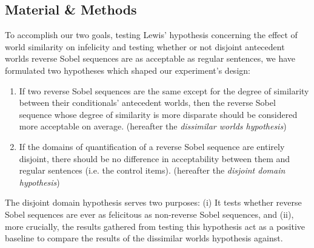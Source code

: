 \subsection{Material \& Methods}
To accomplish our two goals, testing Lewis' hypothesis concerning the effect of world similarity on infelicity and testing whether or not disjoint antecedent worlds reverse Sobel sequences are as acceptable as regular sentences, we have formulated two hypotheses which shaped our experiment's design: 
\begin{enumerate}
    \item If two reverse Sobel sequences are the same except for the degree of similarity between their conditionals' antecedent worlds, then the reverse Sobel sequence whose degree of similarity is more disparate should be considered more acceptable on average. (hereafter the \textit{dissimilar worlds hypothesis})
    \item If the domains of quantification of a reverse Sobel sequence are entirely disjoint, there should be no difference in acceptability between them and regular sentences (i.e. the control items). (hereafter the \textit{disjoint domain hypothesis})
\end{enumerate}
The disjoint domain hypothesis serves two purposes: (i) It tests whether reverse Sobel sequences are ever as felicitous as non-reverse Sobel sequences, and (ii), more crucially, the results gathered from testing this hypothesis act as a positive baseline to compare the results of the dissimilar worlds hypothesis against.

